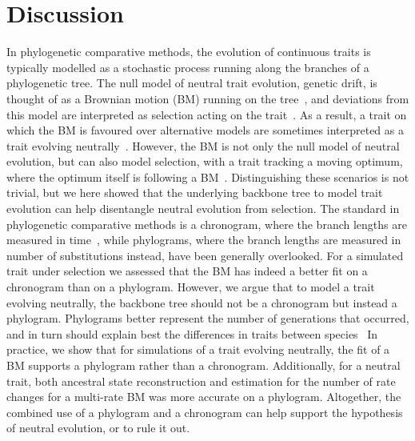 \documentclass{article}
\begin{document}
\section*{Discussion}
In phylogenetic comparative methods, the evolution of continuous traits is typically modelled as a stochastic process running along the branches of a phylogenetic tree.
The null model of neutral trait evolution, genetic drift, is thought of as a Brownian motion (BM) running on the tree~\citep{lynch_phenotypic_1986, felsenstein_phylogenies_1988a}, and deviations from this model are interpreted as selection acting on the trait~\citep{butler_phylogenetic_2004}.
As a result, a trait on which the BM is favoured over alternative models are sometimes interpreted as a trait evolving neutrally~\citep{khaitovich_evolution_2006, catalan_drift_2019}.
However, the BM is not only the null model of neutral evolution, but can also model selection, with a trait tracking a moving optimum, where the optimum itself is following a BM~\citep{hansen_translating_1996, latrille_detecting_2024}.
Distinguishing these scenarios is not trivial, but we here showed that the underlying backbone tree to model trait evolution can help disentangle neutral evolution from selection.
The standard in phylogenetic comparative methods is a chronogram, where the branch lengths are measured in time~\citep{felsenstein_phylogenies_1985, harmon_phylogenetic_2018}, while phylograms, where the branch lengths are measured in number of substitutions instead, have been generally overlooked.
For a simulated trait under selection we assessed that the BM has indeed a better fit on a chronogram than on a phylogram.
However, we argue that to model a trait evolving neutrally, the backbone tree should not be a chronogram but instead a phylogram.
Phylograms better represent the number of generations that occurred, and in turn should explain best the differences in traits between species~\citep{latrille_detecting_2024}
In practice, we show that for simulations of a trait evolving neutrally, the fit of a BM supports a phylogram rather than a chronogram.
Additionally, for a neutral trait, both ancestral state reconstruction and estimation for the number of rate changes for a multi-rate BM was more accurate on a phylogram.
Altogether, the combined use of a phylogram and a chronogram can help support the hypothesis of neutral evolution, or to rule it out.
\end{document}
